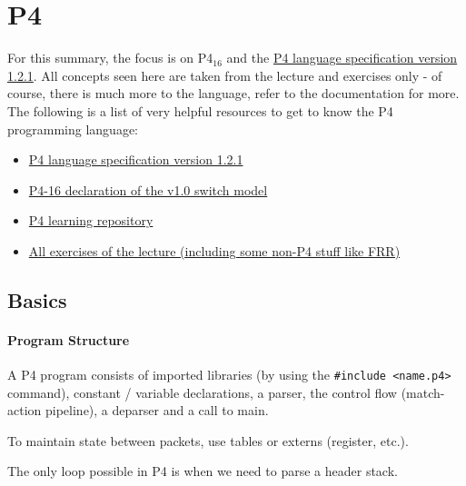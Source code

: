 \section{P4}



For this summary, the focus is on P4$_{16}$ and the \href{https://p4.org/p4-spec/docs/P4-16-v1.2.1.html}{P4 language specification version 1.2.1}. All concepts seen here are taken from the lecture and exercises only - of course, there is much more to the language, refer to the documentation for more. The following is a list of very helpful resources to get to know the P4 programming language:

\begin{itemize}
    \item \href{https://p4.org/p4-spec/docs/P4-16-v1.2.1.html}{P4 language specification version 1.2.1}
    \item \href{https://github.com/p4lang/p4c/blob/master/p4include/v1model.p4}{P4-16 declaration of the v1.0 switch model}
    \item \href{https://github.com/nsg-ethz/p4-learning}{P4 learning repository}
    \item \href{https://gitlab.ethz.ch/nsg/public/adv-net-2020/-/tree/master/}{All exercises of the lecture (including some non-P4 stuff like FRR)}
\end{itemize}


\subsection{Basics}


\paragraph{Program Structure}
A P4 program consists of imported libraries (by using the \texttt{\#include <name.p4>} command), constant / variable declarations, a parser, the control flow (match-action pipeline), a deparser and a call to main.

To maintain state between packets, use tables or externs (register, etc.).

The only loop possible in P4 is when we need to parse a header stack.

